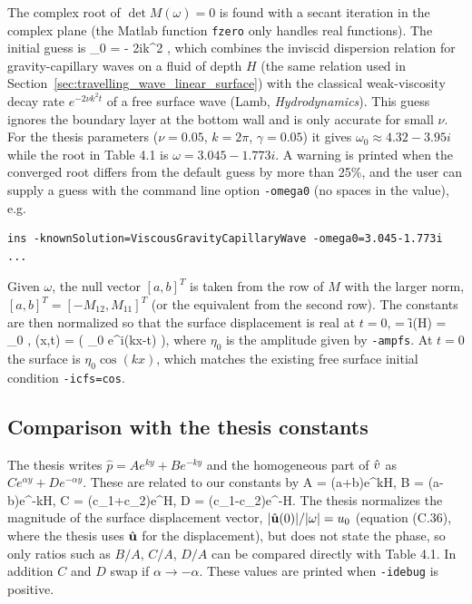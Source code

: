 The complex root of $\det M(\omega)=0$ is found with a secant iteration in the complex plane (the Matlab function \texttt{fzero} only handles real functions).
The initial guess is
\ba
   \omega_0 =  \; - \; 2i\nu k^2 , \label{eq:vcwOmegaGuess}
\ea
which combines the inviscid dispersion relation for gravity-capillary waves on a fluid of depth $H$ (the same relation used in Section~\ref{sec:travelling_wave_linear_surface})
with the classical weak-viscosity decay rate $e^{-2\nu k^2 t}$ of a free surface wave (Lamb, \textit{Hydrodynamics}). This guess ignores the
boundary layer at the bottom wall and is only accurate for small $\nu$. For the thesis parameters ($\nu=0.05$, $k=2\pi$, $\gamma=0.05$) it gives
$\omega_0\approx 4.32-3.95i$ while the root in Table 4.1 is $\omega = 3.045-1.773i$. A warning is printed when the converged root differs from the default
guess by more than 25\%, and the user can supply a guess with the command line option \texttt{-omega0} (no spaces in the value), e.g.
\begin{Verbatim}[fontsize=\small]
   ins -knownSolution=ViscousGravityCapillaryWave -omega0=3.045-1.773i ...
\end{Verbatim}

\mni
Given $\omega$, the null vector $[a,b]^T$ is taken from the row of $M$ with the larger norm, $[a,b]^T = [-M_{12}, M_{11}]^T$ (or the equivalent from the second row).
The constants are then normalized so that the surface displacement is real at $t=0$,
\ba
   \hat{\eta} = \f{i}{\omega}\vHat(H) = \eta_0 , \qquad \eta(x,t) = \Re\big( \eta_0 e^{i(kx-\omega t)} \big),
\ea
where $\eta_0$ is the amplitude given by \texttt{-ampfs}. At $t=0$ the surface is $\eta_0\cos(kx)$, which matches the existing free surface initial condition \texttt{-icfs=cos}.

\subsection{Comparison with the thesis constants} \label{sec:vcw_thesis}

The thesis writes $\hat{p} = Ae^{ky} + Be^{-ky}$ and the homogeneous part of $\hat{v}$ as $Ce^{\alpha y} + De^{-\alpha y}$. These are related to our constants by
\ba
   A = \half(a+b)e^{kH}, \qquad B = \half(a-b)e^{-kH}, \qquad C = \half(c_1+c_2)e^{\alpha H}, \qquad D = \half(c_1-c_2)e^{-\alpha H}.
\ea
The thesis normalizes the magnitude of the surface displacement vector, $|\hat{\mathbf{ u}}(0)|/|\omega| = u_0$ (equation (C.36), where the thesis uses $\hat{\mathbf{ u}}$ for the displacement), but does not state the phase, so only ratios such as $B/A$, $C/A$, $D/A$ can be compared directly
with Table 4.1. In addition $C$ and $D$ swap if $\alpha\rightarrow-\alpha$. These values are printed when \texttt{-idebug} is positive.

